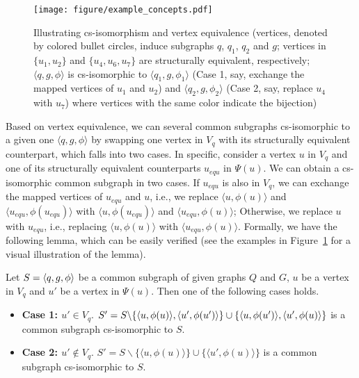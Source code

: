 \begin{figure}[]
		\texttt{[image: figure/example\_concepts.pdf]}
	\caption{Illustrating cs-isomorphism and vertex equivalence (vertices, denoted by colored bullet circles, induce subgraphs $q$, $q_1$, $q_2$ and $g$; vertices in $\{u_1,u_2\}$ and $\{u_4,u_6,u_7\}$ are structurally equivalent, respectively; $\langle q,g,\phi \rangle$ is cs-isomorphic to $\langle q_1,g,\phi_1 \rangle$ (Case 1, say, exchange the mapped vertices of $u_1$ and $u_2$) and $\langle q_2,g,\phi_2 \rangle$  (Case 2, say, replace $u_4$ with $u_7$) where vertices with the same color indicate the bijection)}
 \label{fig:example_self_iso}
\end{figure}

Based on vertex equivalence, we can  several common subgraphs  cs-isomorphic to a given one $\langle q,g,\phi \rangle$ by swapping one vertex in $V_q$ with its structurally equivalent counterpart, which falls into  two cases.
%
{\YuiR In specific, consider a vertex $u$ in $V_q$ and one of its structurally equivalent counterparts  $u_{equ}$ in $\Psi(u)$. {\cheng We can obtain a cs-isomorphic common subgraph in two cases.} If $u_{equ}$ is also in $V_q$, {\cheng we can exchange} the mapped vertices of $u_{equ}$ and $u$, i.e., {\cheng we replace} $\langle u,\phi(u) \rangle$ and $\langle u_{equ},\phi(u_{equ}) \rangle$ with $\langle u,\phi(u_{equ}) \rangle$ and $\langle u_{equ},\phi(u) \rangle$; Otherwise, we replace $u$ with $u_{equ}$, i.e., replacing $\langle u,\phi(u)\rangle$ with $\langle u_{equ},\phi(u) \rangle$.}
%
Formally, we have the following lemma, {\cheng which can be easily verified} (see the examples in Figure~\ref{fig:example_self_iso} for a visual illustration of the lemma).
\begin{lemma}
    \label{lemma:cs}
    Let $S=\langle q,g\eat{p},\phi \rangle$ be a common subgraph of given graphs $Q$ and $G$, $u$ be a vertex in $V_q$ and $u'$ be a vertex in $\Psi(u)$. Then {\kaixin one of the following cases holds}. 
    \begin{itemize}[leftmargin=*]
        \item[]\textbf{Case 1: $u'\in V_q$}. $S'=S\backslash \{\langle u,\phi(u) \rangle,\langle u',\phi(u') \rangle \}\cup \{\langle u,\phi(u') \rangle,\langle u',\\\phi(u) \rangle\}$ is a common subgraph cs-isomorphic to $S$. \;\; {\kaixin{}} 
        \item[]\textbf{Case 2: $u'\notin V_q$}. $S'=S\backslash \{\langle u,\phi(u) \rangle\}\cup \{\langle u',\phi(u) \rangle\}$ is a common subgraph cs-isomorphic to $S$.
    \end{itemize}
\end{lemma}


